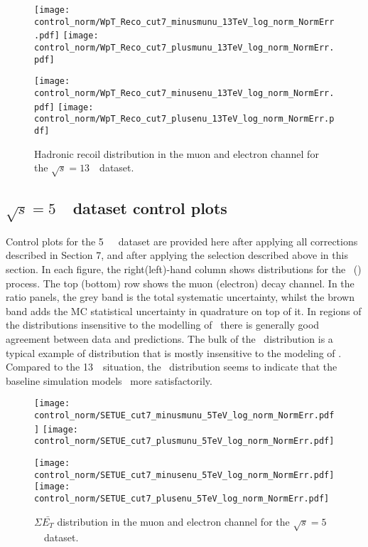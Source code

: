 \begin{figure}[h]
	\centering
	{\texttt{[image: control\_norm/WpT\_Reco\_cut7\_minusmunu\_13TeV\_log\_norm\_NormErr.pdf]}\label{f:}}
	{\texttt{[image: control\_norm/WpT\_Reco\_cut7\_plusmunu\_13TeV\_log\_norm\_NormErr.pdf]}\label{f:}}
	
	{\texttt{[image: control\_norm/WpT\_Reco\_cut7\_minusenu\_13TeV\_log\_norm\_NormErr.pdf]}\label{f:}}
	{\texttt{[image: control\_norm/WpT\_Reco\_cut7\_plusenu\_13TeV\_log\_norm\_NormErr.pdf]}\label{f:}}
	\caption{  Hadronic recoil distribution in the muon and electron channel  for the $\sqrt{s} = 13$~\TeV\ dataset. }\end{figure}


\clearpage


\subsection{$\sqrt{s} = 5$~\TeV\ dataset control plots}
\label{subsec:controlplots5}
Control plots for the 5~\TeV\ \lowmu\ dataset are provided here after applying all corrections described in Section 7, and after applying the selection described above in this section. In each figure, the right(left)-hand column shows distributions for the \Wplus\ (\Wminus) process. The top (bottom) row shows the muon (electron) decay channel. In the ratio panels, the grey band is the total systematic uncertainty, whilst the brown band adds the MC statistical uncertainty in quadrature on top of it. In regions of the distributions insensitive to the modelling of \ptw\ there is generally good agreement between data and predictions. The bulk of the \mt\ distribution is a typical example of distribution that is mostly insensitive to the modeling of \ptw. Compared to the 13~\TeV\ situation, the \ut\ distribution seems to indicate that the baseline simulation models \ptw\ more satisfactorily.

\begin{figure}[h]
	\centering
	{\texttt{[image: control\_norm/SETUE\_cut7\_minusmunu\_5TeV\_log\_norm\_NormErr.pdf]}\label{f:SETUEmm5}}
	{\texttt{[image: control\_norm/SETUE\_cut7\_plusmunu\_5TeV\_log\_norm\_NormErr.pdf]}\label{f:SETUEpm5}}
	
	{\texttt{[image: control\_norm/SETUE\_cut7\_minusenu\_5TeV\_log\_norm\_NormErr.pdf]}\label{f:}}
	{\texttt{[image: control\_norm/SETUE\_cut7\_plusenu\_5TeV\_log\_norm\_NormErr.pdf]}\label{f:}}
	\caption{$\Sigma \bar{E_T}$ distribution in the muon and electron channel  for the $\sqrt{s} = 5$~\TeV\ dataset.}
\end{figure}
%

